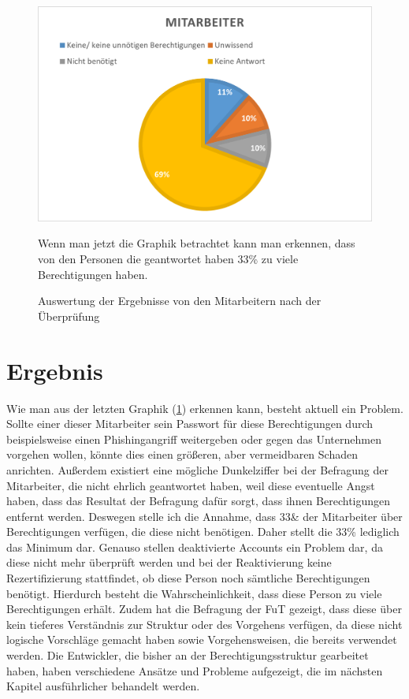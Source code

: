 \begin{figure}[h!]
 \centering
 \includegraphics[width=1\textwidth]{gfx/Picture/Mitarbeiter(korregiert).PNG}
 \caption{Auswertung der Ergebnisse von den Mitarbeitern nach der Überprüfung}
 \label{fig:MitPruf}
Wenn man jetzt die Graphik betrachtet kann man erkennen, dass von den Personen die geantwortet haben 33\% zu viele Berechtigungen haben.

\end{figure}
\section{Ergebnis}
\label{sec:Ergebnis}

Wie man aus der letzten Graphik (\ref{fig:MitPruf}) erkennen kann, besteht aktuell ein Problem.
Sollte einer dieser Mitarbeiter sein Passwort für diese Berechtigungen durch beispielsweise einen Phishingangriff weitergeben oder gegen das Unternehmen vorgehen wollen, könnte dies einen größeren, aber vermeidbaren Schaden anrichten.
Außerdem existiert eine mögliche Dunkelziffer bei der Befragung der Mitarbeiter, die nicht ehrlich geantwortet haben, weil diese eventuelle Angst haben, dass das Resultat der Befragung dafür sorgt, dass ihnen Berechtigungen entfernt werden.
Deswegen stelle ich die Annahme, dass 33\& der Mitarbeiter über Berechtigungen verfügen, die diese nicht benötigen.
Daher stellt die 33\% lediglich das Minimum dar.
Genauso stellen deaktivierte Accounts ein Problem dar, da diese nicht mehr überprüft werden und bei der Reaktivierung keine Rezertifizierung stattfindet, ob diese Person noch sämtliche Berechtigungen benötigt.
Hierdurch besteht die Wahrscheinlichkeit, dass diese Person zu viele Berechtigungen erhält.
Zudem hat die Befragung der \ac{FuT} gezeigt, dass diese über kein tieferes Verständnis zur Struktur oder des Vorgehens verfügen, da diese nicht logische Vorschläge gemacht haben sowie Vorgehensweisen, die bereits verwendet werden.
Die Entwickler, die bisher an der Berechtigungsstruktur gearbeitet haben, haben verschiedene Ansätze und Probleme aufgezeigt, die im nächsten Kapitel ausführlicher behandelt werden.